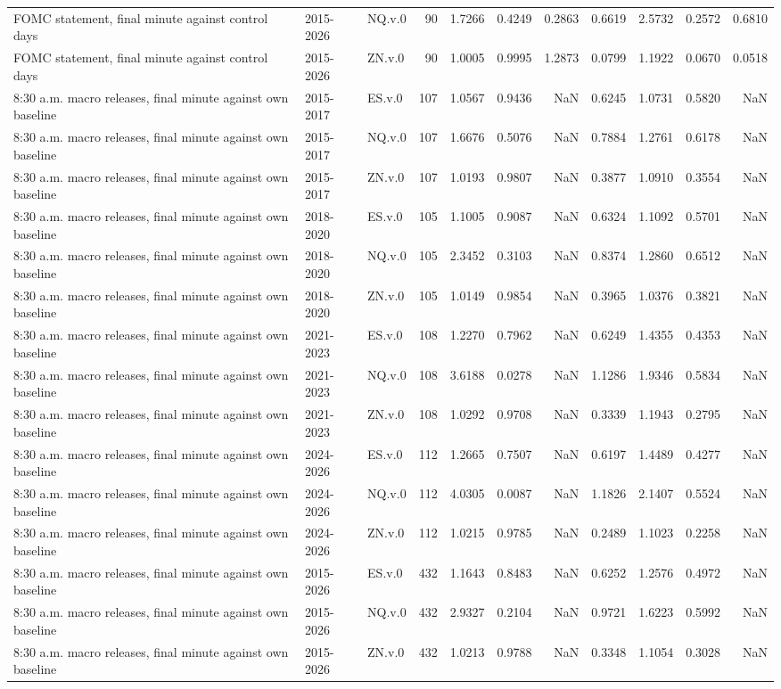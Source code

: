 \begin{tabular}{lllrrrrrrrr}
FOMC statement, final minute against control days & 2015-2026 & NQ.v.0 & 90 & 1.7266 & 0.4249 & 0.2863 & 0.6619 & 2.5732 & 0.2572 & 0.6810 \\
FOMC statement, final minute against control days & 2015-2026 & ZN.v.0 & 90 & 1.0005 & 0.9995 & 1.2873 & 0.0799 & 1.1922 & 0.0670 & 0.0518 \\
8:30 a.m. macro releases, final minute against own baseline & 2015-2017 & ES.v.0 & 107 & 1.0567 & 0.9436 & NaN & 0.6245 & 1.0731 & 0.5820 & NaN \\
8:30 a.m. macro releases, final minute against own baseline & 2015-2017 & NQ.v.0 & 107 & 1.6676 & 0.5076 & NaN & 0.7884 & 1.2761 & 0.6178 & NaN \\
8:30 a.m. macro releases, final minute against own baseline & 2015-2017 & ZN.v.0 & 107 & 1.0193 & 0.9807 & NaN & 0.3877 & 1.0910 & 0.3554 & NaN \\
8:30 a.m. macro releases, final minute against own baseline & 2018-2020 & ES.v.0 & 105 & 1.1005 & 0.9087 & NaN & 0.6324 & 1.1092 & 0.5701 & NaN \\
8:30 a.m. macro releases, final minute against own baseline & 2018-2020 & NQ.v.0 & 105 & 2.3452 & 0.3103 & NaN & 0.8374 & 1.2860 & 0.6512 & NaN \\
8:30 a.m. macro releases, final minute against own baseline & 2018-2020 & ZN.v.0 & 105 & 1.0149 & 0.9854 & NaN & 0.3965 & 1.0376 & 0.3821 & NaN \\
8:30 a.m. macro releases, final minute against own baseline & 2021-2023 & ES.v.0 & 108 & 1.2270 & 0.7962 & NaN & 0.6249 & 1.4355 & 0.4353 & NaN \\
8:30 a.m. macro releases, final minute against own baseline & 2021-2023 & NQ.v.0 & 108 & 3.6188 & 0.0278 & NaN & 1.1286 & 1.9346 & 0.5834 & NaN \\
8:30 a.m. macro releases, final minute against own baseline & 2021-2023 & ZN.v.0 & 108 & 1.0292 & 0.9708 & NaN & 0.3339 & 1.1943 & 0.2795 & NaN \\
8:30 a.m. macro releases, final minute against own baseline & 2024-2026 & ES.v.0 & 112 & 1.2665 & 0.7507 & NaN & 0.6197 & 1.4489 & 0.4277 & NaN \\
8:30 a.m. macro releases, final minute against own baseline & 2024-2026 & NQ.v.0 & 112 & 4.0305 & 0.0087 & NaN & 1.1826 & 2.1407 & 0.5524 & NaN \\
8:30 a.m. macro releases, final minute against own baseline & 2024-2026 & ZN.v.0 & 112 & 1.0215 & 0.9785 & NaN & 0.2489 & 1.1023 & 0.2258 & NaN \\
8:30 a.m. macro releases, final minute against own baseline & 2015-2026 & ES.v.0 & 432 & 1.1643 & 0.8483 & NaN & 0.6252 & 1.2576 & 0.4972 & NaN \\
8:30 a.m. macro releases, final minute against own baseline & 2015-2026 & NQ.v.0 & 432 & 2.9327 & 0.2104 & NaN & 0.9721 & 1.6223 & 0.5992 & NaN \\
8:30 a.m. macro releases, final minute against own baseline & 2015-2026 & ZN.v.0 & 432 & 1.0213 & 0.9788 & NaN & 0.3348 & 1.1054 & 0.3028 & NaN \\
\bottomrule
\end{tabular}
